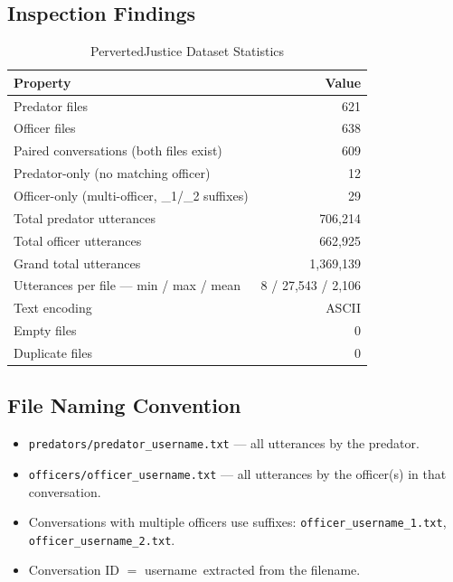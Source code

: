 \documentclass[12pt,a4paper]{article}
\begin{document}
\subsection{Inspection Findings}

\begin{table}[H]
  \centering
  \caption{PervertedJustice Dataset Statistics}
  \begin{tabularx}{\linewidth}{Xr}
    \toprule
    \textbf{Property} & \textbf{Value} \\
    \midrule
    Predator files                            & 621 \\
    Officer files                             & 638 \\
    Paired conversations (both files exist)   & 609 \\
    Predator-only (no matching officer)       & 12  \\
    Officer-only (multi-officer, \_1/\_2 suffixes) & 29 \\
    Total predator utterances                 & 706,214 \\
    Total officer utterances                  & 662,925 \\
    Grand total utterances                    & 1,369,139 \\
    Utterances per file --- min / max / mean  & 8 / 27,543 / 2,106 \\
    Text encoding                             & ASCII \\
    Empty files                               & 0 \\
    Duplicate files                           & 0 \\
    \bottomrule
  \end{tabularx}
  \label{tab:dataset_stats}
\end{table}

\subsection{File Naming Convention}

\begin{itemize}[leftmargin=*]
  \item \texttt{predators/predator\_\textlangle username\textrangle.txt}
        --- all utterances by the predator.
  \item \texttt{officers/officer\_\textlangle username\textrangle.txt}
        --- all utterances by the officer(s) in that conversation.
  \item Conversations with multiple officers use suffixes:
        \texttt{officer\_\textlangle username\textrangle\_1.txt},
        \texttt{officer\_\textlangle username\textrangle\_2.txt}.
  \item Conversation ID $=$ \textlangle username\textrangle\ extracted
        from the filename.
\end{itemize}
\end{document}
